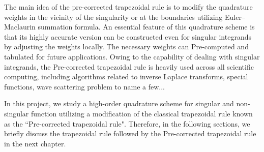 \documentclass[../document.tex]{subfiles}
\begin{document}
	\vspace{3mm}
	
	The main idea of the pre-corrected trapezoidal rule is to modify the quadrature weights in the vicinity of the singularity or at the boundaries utilizing Euler–Maclaurin summation formula. An essential feature of this quadrature scheme is that its highly accurate version can be constructed even for singular integrands by adjusting the weights locally. The necessary weights can Pre-computed and tabulated for future applications.  Owing to the capability of dealing with singular integrands, the Pre-corrected trapezoidal rule is heavily used across all scientific computing, including algorithms related to inverse Laplace transforms, special functions, wave scattering problem to name a few...
	
	\vspace{3mm}	
	
	In this project, we study a high-order quadrature scheme for singular and non-singular function utilizing a modification of the classical trapezoidal rule known as the ``Pre-corrected trapezoidal rule". Therefore, in the following sections, we briefly discuss the trapezoidal rule followed by the Pre-corrected trapezoidal rule in the next chapter.
	
	
	\pagebreak
	
	
	
\end{document}

